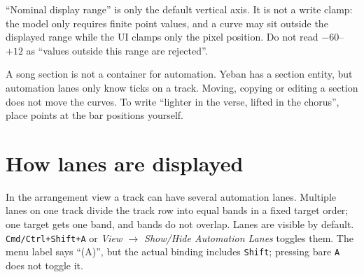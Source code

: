 ``Nominal display range'' is only the default vertical axis. It is not a write clamp: the model only requires finite point values, and a curve may sit outside the displayed range while the UI clamps only the pixel position. Do not read $-60$--$+12$ as ``values outside this range are rejected''.

\begin{center}
\end{center}

A song section is not a container for automation. Yeban has a section entity, but automation lanes only know ticks on a track. Moving, copying or editing a section does not move the curves. To write ``lighter in the verse, lifted in the chorus'', place points at the bar positions yourself.

\section{How lanes are displayed}

In the arrangement view a track can have several automation lanes. Multiple lanes on one track divide the track row into equal bands in a fixed target order; one target gets one band, and bands do not overlap. Lanes are visible by default. \texttt{Cmd/\allowbreak Ctrl+Shift+A} or \emph{View $\rightarrow$ Show/Hide Automation Lanes} toggles them. The menu label says ``(A)'', but the actual binding includes \texttt{Shift}; pressing bare \texttt{A} does not toggle it.

